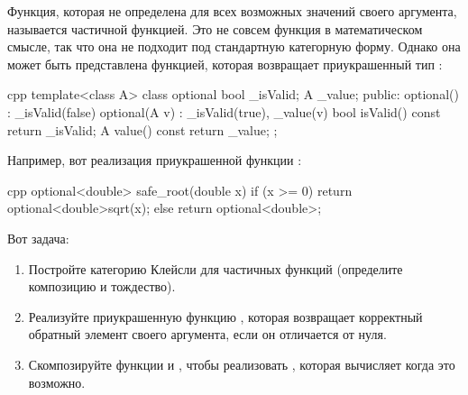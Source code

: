 Функция, которая не определена для всех возможных значений своего аргумента,
называется частичной функцией. Это не совсем функция в
математическом смысле, так что она не подходит под стандартную категорную форму. Однако
она может быть представлена функцией, которая возвращает приукрашенный
тип :

\begin{snip}{cpp}
template<class A> class optional {
    bool _isValid;
    A _value;
public: 
    optional()    : _isValid(false) {}
    optional(A v) : _isValid(true), _value(v) {}
    bool isValid() const { return _isValid; }
    A value() const { return _value; }
};
\end{snip}
Например, вот реализация приукрашенной функции
:

\begin{snip}{cpp}
optional<double> safe_root(double x) {
    if (x >= 0) return optional<double>{sqrt(x)}; 
    else return optional<double>{};
}
\end{snip}
Вот задача:

\begin{enumerate}
  \tightlist
  \item
        Постройте категорию Клейсли для частичных функций (определите
        композицию и тождество).
  \item
        Реализуйте приукрашенную функцию , которая
        возвращает корректный обратный элемент своего аргумента, если он отличается от
        нуля.
  \item
        Скомпозируйте функции  и , чтобы реализовать
        , которая вычисляет 
        когда это возможно.
\end{enumerate}

